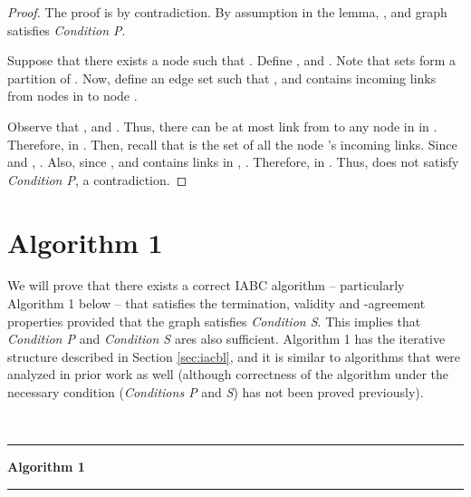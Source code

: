 \documentclass{llncs}
\newcommand{\fillbox}{\hspace*{\fill}}
\begin{document}
\begin{proof}
The proof is by contradiction. By assumption in the lemma, , and graph  satisfies {\em Condition P}.

Suppose that there exists a node  such that . Define , and . Note that sets  form a partition of . Now, define an edge set  such that , and  contains  incoming links from nodes in  to node .

Observe that , and . Thus,  there can be at most  link from  to any node in  in . Therefore,  in . 
Then, recall that  is the set of all the node 's incoming links. Since  and , . Also, since , and  contains  links in , . Therefore,  in .
Thus,  does not satisfy {\em Condition P}, a contradiction. 
\fillbox
\end{proof}




\section{Algorithm 1}
\label{s:algorithm1}

We will prove that there exists a correct IABC algorithm – particularly Algorithm 1 below – that satisfies the termination, validity and
-agreement properties provided that the graph  satisfies {\em Condition S}. This implies that
{\em Condition P} and {\em Condition S} ares also sufficient. Algorithm 1 has the iterative structure described in Section \ref{sec:iacbl}, and
it is similar to algorithms that were analyzed in prior work as
well \cite{vaidya_PODC12,Tseng_general} (although correctness of the algorithm under
the necessary condition ({\em Conditions P} and {\em S}) has not been proved previously).




~

\hrule
{\bf Algorithm 1}
\vspace*{4pt}\hrule
\end{document}
